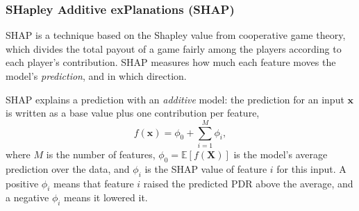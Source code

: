 \subsubsection{SHapley Additive exPlanations (SHAP)}
SHAP \cite{lundbergUnifiedApproachInterpreting2017} is a technique  based
on the Shapley value from cooperative game theory, which divides the
total payout of a game fairly among the players according to each
player's contribution. SHAP measures
how much each feature moves the model's \emph{prediction}, and in
which direction.

SHAP explains a prediction with an \emph{additive} model: the
prediction for an input $\mathbf{x}$ is written as a base value plus
one contribution per feature,
\begin{equation}
    f(\mathbf{x}) = \phi_0 + \sum_{i=1}^{M} \phi_i,
\end{equation}
where $M$ is the number of features, $\phi_0 = \mathbb{E}[f(\mathbf{X})]$
is the model's average prediction over the data, and $\phi_i$ is the
SHAP value of feature $i$ for this input. A positive $\phi_i$ means
that feature $i$ raised the predicted PDR above the average, and a
negative $\phi_i$ means it lowered it.

